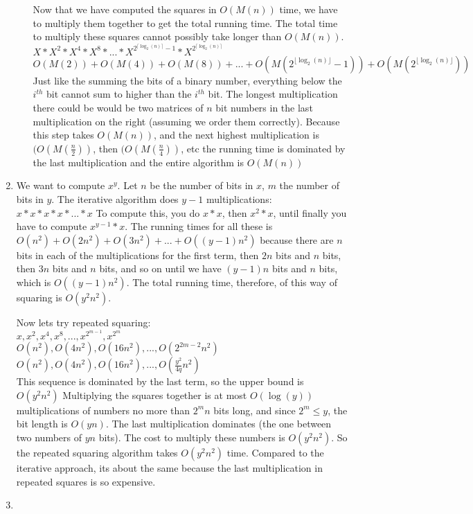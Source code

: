 \documentclass[11pt]{article}
\begin{document}
\begin{enumerate}
\begin{enumerate}
Now that we have computed the squares in $O(M(n))$ time, we have to multiply them together to get the total running time.
The total time to multiply these squares cannot possibly take longer than $O(M(n))$. \\
$X*X^2*X^4*X^8*...*X^{2^{\lceil \log_2(n)\rceil }-1}*X^{2^{\lceil \log_2(n)\rceil }}$\\
$O(M(2))+O(M(4))+O(M(8))+...+O(M(2^{\lfloor \log_2(n)\rfloor }-1))+O(M(2^{\lfloor \log_2(n)\rfloor}))$ \\
Just like the summing the bits of a binary number, everything below the $i^{th}$ bit cannot sum to higher than the $i^{th}$ bit. The longest multiplication there could be would be two matrices of $n$ bit numbers in the last multiplication on the right (assuming we order them correctly). Because this step takes $O(M(n))$, and the next highest multiplication is $(O(M(\frac{n}{2}))$, then $(O(M(\frac{n}{4}))$, etc the running time is dominated by the last multiplication and the entire algorithm is $O(M(n))$

\end{enumerate}
\newpage


\item
We want to compute $x^y$. Let $n$ be the number of bits in $x$, $m$ the number of bits in $y$. The iterative algorithm does $y-1$ multiplications: 
$x*x*x*x*...*x$
To compute this, you do $x*x$, then $x^2*x$, until finally you have to compute $x^{y-1}*x$. The running times for all these is $O(n^2) + O(2n^2) + O(3n^2) + ... + O((y-1)n^2)$ because there are $n$ bits in each of the multiplications for the first term, then $2n$ bits and $n$ bits, then $3n$ bits and $n$ bits, and so on until we have $(y-1)n$ bits and $n$ bits, which is $O((y-1)n^2)$. The total running time, therefore, of this way of squaring is $O(y^2n^2)$.

Now lets try repeated squaring:\\
$x, x^2, x^4, x^8, ..., x^{2^{m-1}}, x^{2^m}$\\
$O(n^2), O(4n^2), O(16n^2), ..., O(2^{2m-2}n^2)$\\
$O(n^2), O(4n^2), O(16n^2), ..., O(\frac{y^2}{4q}n^2)$\\
This sequence is dominated by the last term, so the upper bound is $O(y^2n^2)$
Multiplying the squares together is at most $O(\log(y))$ multiplications of numbers no more than $2^mn$ bits long, and since $2^m\le y$, the bit length is $O(yn)$. The last multiplication dominates (the one between two numbers of $yn$ bits). The cost to multiply these numbers is $O(y^2n^2)$. So the repeated squaring algorithm takes $O(y^2n^2)$ time. Compared to the iterative approach, its about the same because the last multiplication in repeated squares is so expensive.
\newpage
\item


\end{enumerate}
\end{document}
